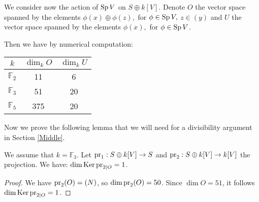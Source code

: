 We consider now the action of $\operatorname{Sp} V$ on $S\oplus k[V]$. 
Denote $O$ the vector space spanned by the elements $\phi(x)\oplus \phi(z),$ for $\phi \in \operatorname{Sp} V,$ $z \in (y)$
and $U$ the vector space spanned by the elements $\phi(x),$ for $\phi \in \operatorname{Sp} V$.
\begin{proposition}\label{CombinedSymplectic}
Then we have by numerical computation:
\vspace{2mm}
\begin{center}
\begin{tabular}{c||c|c}
 $k$ & $\dim_k O$  & $\dim_k U$\\
\hline
$\mathbb F_2$ & 11 & 6 \\
$\mathbb F_3$ & 51  & 20 \\
$\mathbb F_5$ & 375  & 20 
\end{tabular}
\end{center}
\end{proposition}
Now we prove the following lemma that we will need for a divisibility argument in Section \ref{Middle}.
\begin{lemme}\label{cleffinclassesdiv}
We assume that $k=\mathbb F_3$. Let $\operatorname{pr}_1: S\oplus k[V]\rightarrow S$ and $\operatorname{pr}_2: S\oplus k[V]\rightarrow k[V]$ the projection. 
We have: 
$\dim \operatorname{Ker}\operatorname{pr}_{2|O}=1$.
\end{lemme}
\begin{proof}
We have $\operatorname{pr}_{2}(O)=(N)$, so $\dim \operatorname{pr}_{2}(O)=50$.
Since $\dim O=51$, it follows $\dim \operatorname{Ker}\operatorname{pr}_{2|O}=1$. 
\end{proof}
